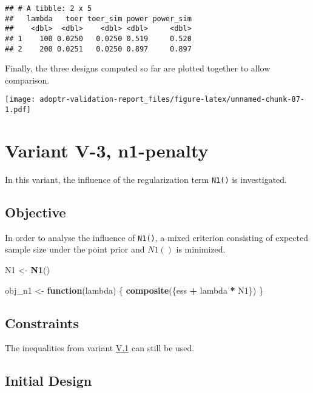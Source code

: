 \documentclass[
]{book}
\newenvironment{Shaded}{\begin{snugshade}}{\end{snugshade}}
\newcommand{\ControlFlowTok}[1]{\textcolor[rgb]{0.13,0.29,0.53}{\textbf{#1}}}
\newcommand{\KeywordTok}[1]{\textcolor[rgb]{0.13,0.29,0.53}{\textbf{#1}}}
\newcommand{\NormalTok}[1]{#1}
\newcommand{\OperatorTok}[1]{\textcolor[rgb]{0.81,0.36,0.00}{\textbf{#1}}}
\newcommand{\StringTok}[1]{\textcolor[rgb]{0.31,0.60,0.02}{#1}}
\begin{document}
\begin{verbatim}
## # A tibble: 2 x 5
##   lambda   toer toer_sim power power_sim
##    <dbl>  <dbl>    <dbl> <dbl>     <dbl>
## 1    100 0.0250   0.0250 0.519     0.520
## 2    200 0.0251   0.0250 0.897     0.897
\end{verbatim}

Finally, the three designs computed so far are plotted together to allow
comparison.

\texttt{[image: adoptr-validation-report\_files/figure-latex/unnamed-chunk-87-1.pdf]}

\hypertarget{variantV_3}{%
\section{Variant V-3, n1-penalty}\label{variantV_3}}

In this variant, the influence of the regularization term \texttt{N1()} is investigated.

\hypertarget{objective-12}{%
\subsection{Objective}\label{objective-12}}

In order to analyse the influence of \texttt{N1()},
a mixed criterion consisting of expected sample size under the point prior
and \(N1()\) is minimized.

\begin{Shaded}
\begin{Highlighting}[]
\NormalTok{N1 \textless{}{-}}\StringTok{ }\KeywordTok{N1}\NormalTok{()}

\NormalTok{obj\_n1 \textless{}{-}}\StringTok{ }\ControlFlowTok{function}\NormalTok{(lambda) \{}
  \KeywordTok{composite}\NormalTok{(\{ess }\OperatorTok{+}\StringTok{ }\NormalTok{lambda }\OperatorTok{*}\StringTok{ }\NormalTok{N1\})}
\NormalTok{\}}
\end{Highlighting}
\end{Shaded}

\hypertarget{constraints-12}{%
\subsection{Constraints}\label{constraints-12}}

The inequalities from variant \protect\hyperlink{variantV_1}{V.1} can still be used.

\hypertarget{initial-design-10}{%
\subsection{Initial Design}\label{initial-design-10}}
\end{document}
